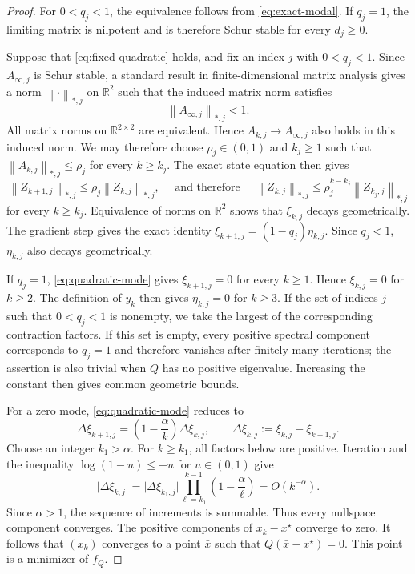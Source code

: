 \documentclass[11pt]{article}
\theoremstyle{plain}
\theoremstyle{definition}
\newcommand{\R}{\mathbb{R}}
\newcommand{\norm}[1]{\left\lVert #1\right\rVert}
\begin{document}
{\begin{proof}
For $0<q_j<1$, the equivalence follows from
\eqref{eq:exact-modal}. If $q_j=1$, the limiting matrix is nilpotent and is
therefore Schur stable for every $d_j\geq0$.

Suppose that \eqref{eq:fixed-quadratic} holds, and
fix an index $j$ with $0<q_j<1$. Since $A_{\infty,j}$ is Schur
stable, a standard result in
finite-dimensional matrix analysis gives a norm $\norm{\cdot}_{\ast,j}$ on
$\R^2$ such that the induced matrix norm satisfies
$$
\norm{A_{\infty,j}}_{\ast,j}<1.
$$
All matrix norms on $\R^{2\times2}$ are equivalent. Hence
$A_{k,j}\to A_{\infty,j}$ also holds in this induced norm. We may therefore
choose $\rho_j\in(0,1)$ and $k_j\geq1$ such that $
\norm{A_{k,j}}_{\ast,j}\leq\rho_j$
for every $k\geq k_j$. The exact state equation then gives
$$
\norm{Z_{k+1,j}}_{\ast,j}
\leq\rho_j\norm{Z_{k,j}}_{\ast,j},
\quad \mbox{ and therefore }
\quad
\norm{Z_{k,j}}_{\ast,j}
\leq \rho_j^{k-k_j}\norm{Z_{k_j,j}}_{\ast,j}
$$
for every $k\geq k_j$. Equivalence of norms on $\R^2$ shows that
$\xi_{k,j}$ decays geometrically. The gradient step gives the exact identity $
\xi_{k+1,j}=(1-q_j)\eta_{k,j}.$
Since $q_j<1$, $\eta_{k,j}$ also decays geometrically.

If $q_j=1$, \eqref{eq:quadratic-mode} gives $\xi_{k+1,j}=0$ for every $k\geq1$. Hence $\xi_{k,j}=0$ for $k\geq2$. The definition of $y_k$ then
gives $\eta_{k,j}=0$ for $k\geq3$. If the set of indices $j$ such that $0<q_j<1$ is nonempty, we take the largest of the corresponding contraction factors. If this set is empty,
every positive spectral component corresponds to $q_j=1$ and therefore vanishes after finitely many iterations; the assertion is also trivial
when $Q$ has no positive eigenvalue. Increasing the constant then gives common geometric bounds.

For a zero mode, \eqref{eq:quadratic-mode} reduces to
$$
\Delta\xi_{k+1,j}
=\left(1-\frac{\alpha}{k}\right)\Delta\xi_{k,j},
\qquad
\Delta\xi_{k,j}:=\xi_{k,j}-\xi_{k-1,j}.
$$
Choose an integer $k_1>\alpha$. For $k\geq k_1$, all factors below are
positive. Iteration and the inequality $\log(1-u)\leq-u$ for $u\in(0,1)$
give
$$
\lvert\Delta\xi_{k,j}\rvert
=\lvert\Delta\xi_{k_1,j}\rvert
\prod_{\ell=k_1}^{k-1}\left(1-\frac{\alpha}{\ell}\right)
=O(k^{-\alpha}).
$$
Since $\alpha>1$, the sequence of increments is summable. Thus every nullspace component converges. The positive components of $x_k-x^\star$
converge to zero. It follows that $(x_k)$ converges to a point $\bar x$ such that $Q(\bar x-x^\star)=0$. This point is a minimizer of $f_Q$.


\end{proof}}
\end{document}
